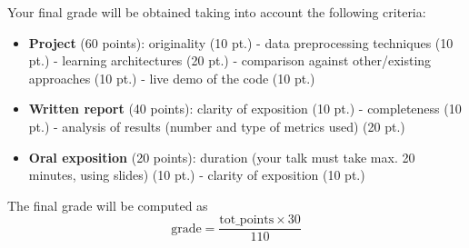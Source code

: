 \documentclass[10pt, conference, letterpaper]{IEEEtran}
\begin{document}
Your final grade will be obtained taking into account the following criteria:
\begin{itemize} 
\item \textbf{Project} (60 points): originality (10 pt.) - data preprocessing techniques (10 pt.) - learning architectures (20 pt.) - comparison against other/existing approaches (10 pt.) - live demo of the code (10 pt.)
\item \textbf{Written report} (40 points): clarity of exposition (10 pt.) - completeness (10 pt.) - analysis of results (number and type of metrics used) (20 pt.)
\item \textbf{Oral exposition} (20 points): duration (your talk must take max. 20 minutes, using slides) (10 pt.) - clarity of exposition (10 pt.)
\end{itemize}

The final grade will be computed as
\begin{equation}
\textrm{grade} = \frac{\textrm{tot\_points} \times 30}{110}
\end{equation}



\end{document}
